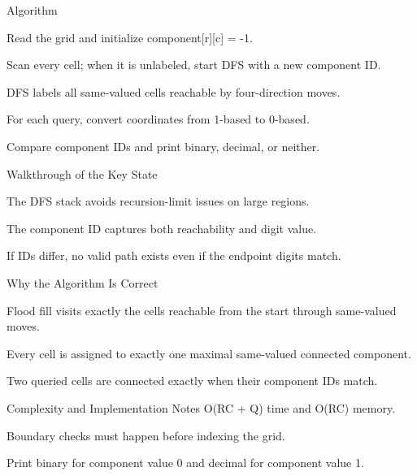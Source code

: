 \documentclass[aspectratio=169,11pt]{beamer}
\begin{document}
\begin{frame}{Algorithm}
\begin{tightitemize}
  \item Read the grid and initialize component[r][c] = -1.
  \item Scan every cell; when it is unlabeled, start DFS with a new component ID.
  \item DFS labels all same-valued cells reachable by four-direction moves.
  \item For each query, convert coordinates from 1-based to 0-based.
  \item Compare component IDs and print binary, decimal, or neither.
\end{tightitemize}
\end{frame}

\begin{frame}{Walkthrough of the Key State}
\begin{tightitemize}
  \item The DFS stack avoids recursion-limit issues on large regions.
  \item The component ID captures both reachability and digit value.
  \item If IDs differ, no valid path exists even if the endpoint digits match.
\end{tightitemize}
\end{frame}

\begin{frame}{Why the Algorithm Is Correct}
\begin{tightitemize}
  \item Flood fill visits exactly the cells reachable from the start through same-valued moves.
  \item Every cell is assigned to exactly one maximal same-valued connected component.
  \item Two queried cells are connected exactly when their component IDs match.
\end{tightitemize}
\end{frame}

\begin{frame}{Complexity and Implementation Notes}
\small
{} O(RC + Q) time and O(RC) memory.

\vspace{0.3cm}
\begin{tightitemize}
  \item Boundary checks must happen before indexing the grid.
  \item Print binary for component value 0 and decimal for component value 1.
\end{tightitemize}
\end{frame}
\end{document}
